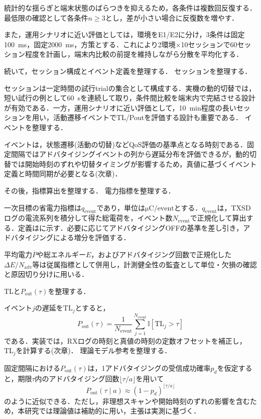 統計的な揺らぎと端末状態のばらつきを抑えるため，各条件は複数回反復する．最低限の確認として各条件$n\ge3$とし，差が小さい場合に反復数を増やす．

また，運用シナリオに近い評価としては，環境をE1/E2に分け，3条件は固定\SI{100}{\milli\second}，固定\SI{2000}{\milli\second}，方策とする．これにより2環境$\times$10セッションで60セッション程度を計画し，端末内比較の前提を維持しながら分散を平均化する．

続いて，セッション構成とイベント定義を整理する．
セッションを整理する．

セッションは一定時間の試行trialの集合として構成する．実機の動的切替では，短い試行の例として\SI{60}{\second}を連続して取り，条件間比較を端末内で完結させる設計が有効である．一方，運用シナリオに近い評価として，\SI{10}{\minute}程度の長いセッションを用い，活動遷移イベントでTL/Poutを評価する設計も重要である．
イベントを整理する．

イベントは，状態遷移(活動の切替)などQoS評価の基準点となる時刻である．固定間隔ではアドバタイジングイベントの列から遅延分布を評価できるが，動的切替では開始時刻のずれや切替タイミングが影響するため，真値に基づくイベント定義と時間同期が必要となる(次章)．

その後，指標算出を整理する．
電力指標を整理する．

一次目標の省電力指標は$q_{\mathrm{event}}$であり，単位は$\si{\micro\coulomb}/\text{event}$とする．$q_{\mathrm{event}}$は，TXSDログの電流系列を積分して得た総電荷を，イベント数$N_{\mathrm{event}}$で正規化して算出する．定義はに示す．必要に応じてアドバタイジングOFFの基準を差し引き，アドバタイジングによる増分を評価する．

平均電力$\overline{P}$や総エネルギー$E$，およびアドバタイジング回数で正規化した$\Delta E/N_{\mathrm{adv}}$等は従属指標として併用し，計測健全性の監査として単位・欠損の確認と原因切り分けに用いる．

TLと$P_{\mathrm{out}}(\tau)$を整理する．

イベント$j$の遅延を$\mathrm{TL}_j$とすると，
\begin{equation}
  P_{\mathrm{out}}(\tau)=\frac{1}{N_{\mathrm{event}}}\sum_{j=1}^{N_{\mathrm{event}}}\mathbb{I}[\mathrm{TL}_j>\tau]
\end{equation}
である．実装では，RXログの時刻と真値の時刻の定数オフセットを補正し，$\mathrm{TL}_j$を計算する(次章)．
理論モデル参考を整理する．

固定間隔における$P_{\mathrm{out}}(\tau)$は，1アドバタイジングの受信成功確率$p_d$を仮定すると，期限$\tau$内のアドバタイジング回数$\lfloor \tau/a \rfloor$を用いて
\begin{equation}
  P_{\mathrm{out}}(\tau\mid a)\approx(1-p_d)^{\lfloor \tau/a \rfloor}
\end{equation}
のように近似できる．ただし，非理想スキャンや開始時刻のずれの影響を含むため，本研究では理論値は補助的に用い，主張は実測に基づく．

